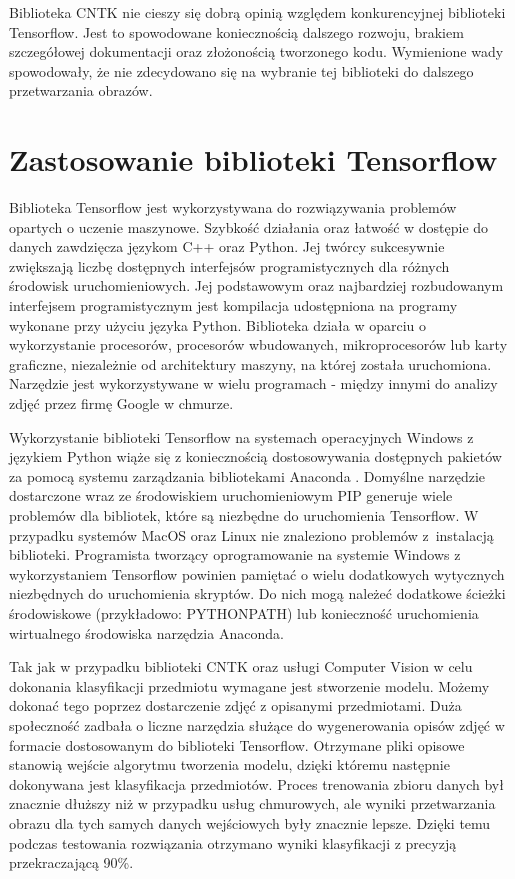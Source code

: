 {{Biblioteka CNTK nie cieszy się dobrą opinią względem konkurencyjnej biblioteki Tensorflow. Jest to spowodowane koniecznością dalszego rozwoju, brakiem szczegółowej dokumentacji oraz złożonością tworzonego kodu. Wymienione wady spowodowały, że nie zdecydowano się na wybranie tej biblioteki do dalszego przetwarzania obrazów. 
}

\section{Zastosowanie biblioteki Tensorflow}{
Biblioteka Tensorflow \cite{Tensorflow} jest wykorzystywana do rozwiązywania problemów opartych o uczenie maszynowe. Szybkość działania oraz łatwość w dostępie do danych zawdzięcza językom C++ oraz Python. Jej twórcy sukcesywnie zwiększają liczbę dostępnych interfejsów programistycznych dla różnych środowisk uruchomieniowych. Jej podstawowym oraz najbardziej rozbudowanym interfejsem programistycznym jest kompilacja udostępniona na programy wykonane przy użyciu języka Python. Biblioteka działa w oparciu o wykorzystanie procesorów, procesorów wbudowanych, mikroprocesorów lub karty graficzne, niezależnie od architektury maszyny, na której została uruchomiona. Narzędzie jest wykorzystywane w wielu programach - między innymi do analizy zdjęć przez firmę Google w chmurze. 

Wykorzystanie biblioteki Tensorflow na systemach operacyjnych Windows z językiem Python wiąże się z koniecznością dostosowywania dostępnych pakietów za pomocą systemu zarządzania bibliotekami Anaconda \cite{Anaconda}. Domyślne narzędzie dostarczone wraz ze środowiskiem uruchomieniowym PIP generuje wiele problemów dla bibliotek, które są niezbędne do uruchomienia Tensorflow. W przypadku systemów MacOS oraz Linux nie znaleziono problemów z~instalacją biblioteki. Programista tworzący oprogramowanie na systemie Windows z wykorzystaniem Tensorflow powinien pamiętać o wielu dodatkowych wytycznych niezbędnych do uruchomienia skryptów. Do nich mogą należeć dodatkowe ścieżki środowiskowe (przykładowo: PYTHONPATH) lub konieczność uruchomienia wirtualnego środowiska narzędzia Anaconda. 

Tak jak w przypadku biblioteki CNTK oraz usługi Computer Vision w celu dokonania klasyfikacji przedmiotu wymagane jest stworzenie modelu. Możemy dokonać tego poprzez dostarczenie zdjęć z opisanymi przedmiotami. Duża społeczność zadbała o liczne narzędzia służące do wygenerowania opisów zdjęć w formacie dostosowanym do biblioteki Tensorflow. Otrzymane pliki opisowe stanowią wejście algorytmu tworzenia modelu, dzięki któremu następnie dokonywana jest klasyfikacja przedmiotów. Proces trenowania zbioru danych był znacznie dłuższy niż w przypadku usług chmurowych, ale wyniki przetwarzania obrazu dla tych samych danych wejściowych były znacznie lepsze. Dzięki temu podczas testowania rozwiązania otrzymano wyniki klasyfikacji z precyzją przekraczającą 90\%.

}}
